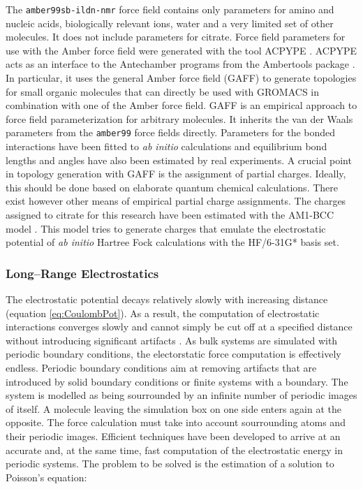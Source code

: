 \documentclass[english, a4paper, 12pt, titlepage, draft]{article}
\begin{document}
The \texttt{amber99sb-ildn-nmr} force field contains only parameters for amino and nucleic acids, biologically relevant ions, water and a very limited set of other molecules.
It does not include parameters for citrate.
Force field parameters for use with the Amber force field were generated with the tool ACPYPE \cite{ACPYPE}.
ACPYPE acts as an interface to the Antechamber programs from the Ambertools package \cite{antechamber}.
In particular, it uses the general Amber force field (GAFF) \cite{GAFF} to generate topologies for small organic molecules that can directly be used with GROMACS in combination with one of the Amber force field.
GAFF is an empirical approach to force field parameterization for arbitrary molecules.
It inherits the van der Waals parameters from the \texttt{amber99} force fields directly.
Parameters for the bonded interactions have been fitted to \textit{ab initio} calculations and equilibrium bond lengths and angles have also been estimated by real experiments.
A crucial point in topology generation with GAFF is the assignment of partial charges.
Ideally, this should be done based on elaborate quantum chemical calculations.
There exist however other means of empirical partial charge assignments.
The charges assigned to citrate for this research have been estimated with the AM1-BCC model \cite{am1bcc_method, am1bcc_validation}.
This model tries to generate charges that emulate the electrostatic potential of \textit{ab initio} Hartree Fock calculations with the HF/6-31G* basis set.



\subsubsection{Long--Range Electrostatics}
\label{sec:PME}

The electrostatic potential decays relatively slowly with increasing distance (equation \ref{eq:CoulombPot}).
As a result, the computation of electrostatic interactions converges slowly and cannot simply be cut off at a specified distance without introducing significant artifacts \cite{FrenkelSmit}.
As bulk systems are simulated with periodic boundary conditions, the electorstatic force computation is effectively endless.
Periodic boundary conditions aim at removing artifacts that are introduced by solid boundary conditions or finite systems with a boundary.
The system is modelled as being sourrounded by an infinite number of periodic images of itself.
A molecule leaving the simulation box on one side enters again at the opposite.
The force calculation must take into account sourrounding atoms and their periodic images.
Efficient techniques have been developed to arrive at an accurate and, at the same time, fast computation of the electrostatic energy in periodic systems.
The problem to be solved is the estimation of a solution to Poisson's equation:
\end{document}
